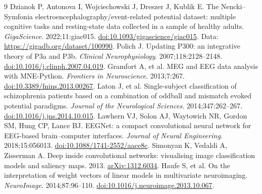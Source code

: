 \documentclass[11pt,a4paper]{article}
\begin{document}
\begin{thebibliography}{9}
 Dzianok P, Antonova I, Wojciechowski J, Dreszer J, Kublik E. The Nencki--Symfonia electroencephalography/event-related potential dataset: multiple cognitive tasks and resting-state data collected in a sample of healthy adults. \emph{GigaScience}. 2022;11:giac015. \href{https://doi.org/10.1093/gigascience/giac015}{doi:10.1093/gigascience/giac015}. Data: \url{https://gigadb.org/dataset/100990}.
 Polich J. Updating P300: an integrative theory of P3a and P3b. \emph{Clinical Neurophysiology}. 2007;118:2128--2148. \href{https://doi.org/10.1016/j.clinph.2007.04.019}{doi:10.1016/j.clinph.2007.04.019}.
 Gramfort A, et al. MEG and EEG data analysis with MNE-Python. \emph{Frontiers in Neuroscience}. 2013;7:267. \href{https://doi.org/10.3389/fnins.2013.00267}{doi:10.3389/fnins.2013.00267}.
 Laton J, et al. Single-subject classification of schizophrenia patients based on a combination of oddball and mismatch evoked potential paradigms. \emph{Journal of the Neurological Sciences}. 2014;347:262--267. \href{https://doi.org/10.1016/j.jns.2014.10.015}{doi:10.1016/j.jns.2014.10.015}.
 Lawhern VJ, Solon AJ, Waytowich NR, Gordon SM, Hung CP, Lance BJ. EEGNet: a compact convolutional neural network for EEG-based brain--computer interfaces. \emph{Journal of Neural Engineering}. 2018;15:056013. \href{https://doi.org/10.1088/1741-2552/aace8c}{doi:10.1088/1741-2552/aace8c}.
 Simonyan K, Vedaldi A, Zisserman A. Deep inside convolutional networks: visualising image classification models and saliency maps. 2013. \href{https://arxiv.org/abs/1312.6034}{arXiv:1312.6034}.
 Haufe S, et al. On the interpretation of weight vectors of linear models in multivariate neuroimaging. \emph{NeuroImage}. 2014;87:96--110. \href{https://doi.org/10.1016/j.neuroimage.2013.10.067}{doi:10.1016/j.neuroimage.2013.10.067}.
\end{thebibliography}
\end{document}
